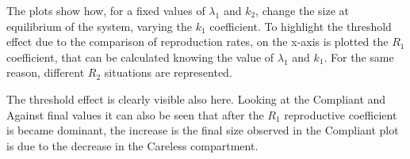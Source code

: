 The plots show how, for a fixed values of $\lambda_1$ and $k_2$, change the size at equilibrium of the system, varying the $k_1$ coefficient. To highlight the threshold effect due to the comparison of reproduction rates, on the x-axis is plotted the $R_1$  coefficient, that can be calculated knowing the value of  $\lambda_1$ and $k_1$. For the same reason, different $R_2$ situations are represented. 

The threshold effect is clearly visible also here. Looking at the Compliant and Against final values it can also be seen that after the $R_1$ reproductive coefficient is became dominant, the  increase is the final size observed in the Compliant plot is due to the decrease in the Careless compartment. 